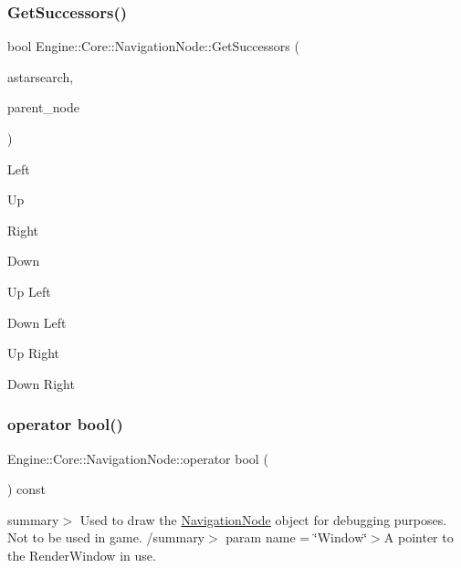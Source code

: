 \subsubsection{\texorpdfstring{Get\+Successors()}{GetSuccessors()}}
{\footnotesize\ttfamily bool Engine\+::\+Core\+::\+Navigation\+Node\+::\+Get\+Successors (\begin{DoxyParamCaption}\item[{\hyperlink{class_a_star_search}{A\+Star\+Search}$<$ \hyperlink{struct_engine_1_1_core_1_1_navigation_node}{Navigation\+Node} $>$ $\ast$}]{astarsearch,  }\item[{\hyperlink{struct_engine_1_1_core_1_1_navigation_node}{Navigation\+Node} $\ast$}]{parent\+\_\+node }\end{DoxyParamCaption})}

Left

Up

Right

Down

Up Left

Down Left

Up Right

Down Right \mbox{\label{struct_engine_1_1_core_1_1_navigation_node_a6435f925c6b28774a025f5650bd76b56}} 
\subsubsection{\texorpdfstring{operator bool()}{operator bool()}}
{\footnotesize\ttfamily Engine\+::\+Core\+::\+Navigation\+Node\+::operator bool (\begin{DoxyParamCaption}{ }\end{DoxyParamCaption}) const\hspace{0.3cm}{\ttfamily [explicit]}}

summary$>$ Used to draw the \hyperlink{struct_engine_1_1_core_1_1_navigation_node}{Navigation\+Node} object for debugging purposes. Not to be used in game. /summary$>$ param name = \char`\"{}\+Window\char`\"{}$>$A pointer to the Render\+Window in use.\mbox{\label{struct_engine_1_1_core_1_1_navigation_node_a12cffe89f89aac9623ae2530dd556dc7}} 
